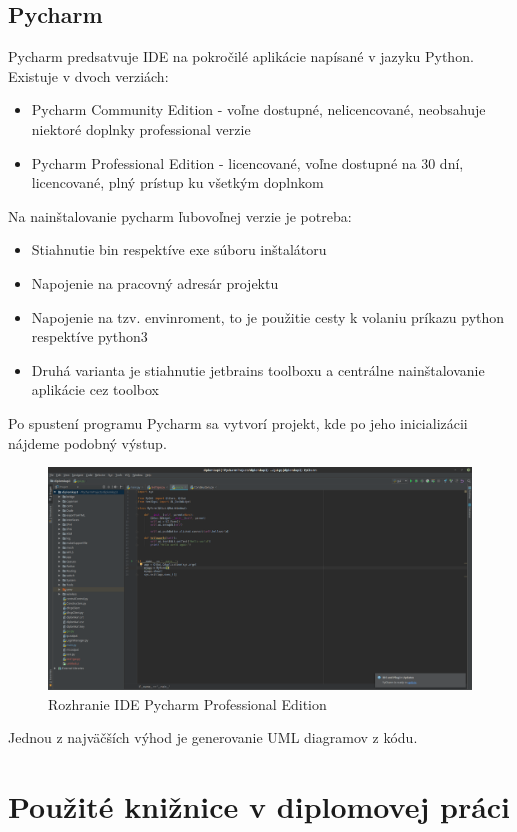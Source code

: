 \section{Pycharm}
Pycharm predsatvuje IDE na pokročilé aplikácie napísané v jazyku Python. Existuje v dvoch verziách:\begin{itemize}
\item Pycharm Community Edition - voľne dostupné, nelicencované, neobsahuje niektoré doplnky professional verzie
\item Pycharm Professional Edition - licencované, voľne dostupné na 30 dní, licencované, plný prístup ku všetkým doplnkom
\end{itemize}
Na nainštalovanie pycharm ľubovoľnej verzie je potreba:\begin{itemize}
\item Stiahnutie bin respektíve exe súboru inštalátoru
\item Napojenie na pracovný adresár projektu
\item Napojenie na tzv. envinroment, to je použitie cesty k volaniu príkazu python respektíve python3
\item Druhá varianta je stiahnutie jetbrains toolboxu a centrálne nainštalovanie aplikácie cez toolbox
\end{itemize}
Po spustení programu Pycharm sa vytvorí projekt, kde po jeho inicializácii nájdeme podobný výstup.
\begin{figure}[H]
\centering
\includegraphics[scale=0.25]{../text/pycharm.png}
\caption{Rozhranie IDE Pycharm Professional Edition}
\label{fig:webfig}
\end{figure} 
Jednou z najväčších výhod je generovanie UML diagramov z kódu.
\chapter{Použité knižnice v diplomovej práci}
